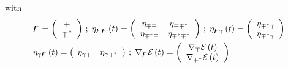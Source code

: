 \documentclass[aps,preprint]{revtex4}%
\begin{document}
with
\begin{align}
&  \mathbf{\digamma}=\left(
\begin{array}
[c]{c}%
\mathcal{\Upsilon}\\
\mathcal{\Upsilon}^{\ast}%
\end{array}
\right)  \,;\;\eta_{\digamma\digamma}\left(  t\right)  =\left(
\begin{array}
[c]{cc}%
\eta_{\mathcal{\Upsilon\Upsilon}} & \eta_{\mathcal{\Upsilon\Upsilon}^{\ast}}\\
\eta_{\mathcal{\Upsilon}^{\ast}\mathcal{\Upsilon}} & \eta_{\mathcal{\Upsilon
}^{\ast}\mathcal{\Upsilon}^{\ast}}%
\end{array}
\right)  \,;\;\eta_{\mathbf{\digamma}\gamma}\left(  t\right)  =\left(
\begin{array}
[c]{c}%
\eta_{\mathcal{\Upsilon}^{\ast}\gamma}\\
\eta_{\mathcal{\Upsilon}^{\ast}\gamma}%
\end{array}
\right) \nonumber\\
&  \eta_{\gamma\mathbf{\digamma}}\left(  t\right)  =\left(
\begin{array}
[c]{cc}%
\eta_{\gamma\mathcal{\Upsilon}} & \eta_{\gamma\mathcal{\Upsilon}^{\ast}}%
\end{array}
\right)  \,;\;\nabla_{\digamma}\mathcal{E}\left(  t\right)  =\left(
\begin{array}
[c]{c}%
\nabla_{\mathcal{\Upsilon}}\mathcal{E}\left(  t\right) \\
\nabla_{\mathcal{\Upsilon}^{\ast}}\mathcal{E}\left(  t\right)
\end{array}
\right)
\end{align}
\end{document}
